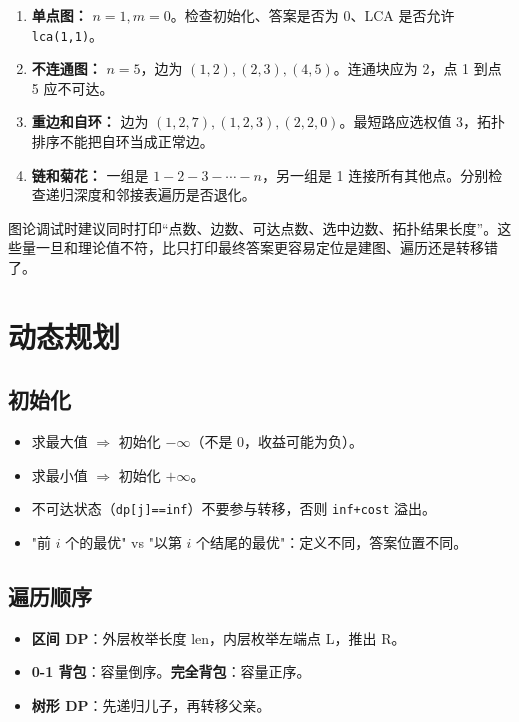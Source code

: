 \documentclass[UTF8,openany,oneside,zihao=-4]{ctexbook}
\begin{document}
\begin{enumerate}
  \item \textbf{单点图：} $n=1,m=0$。检查初始化、答案是否为 0、LCA 是否允许 \lstinline|lca(1,1)|。
  \item \textbf{不连通图：} $n=5$，边为 $(1,2),(2,3),(4,5)$。连通块应为 2，点 1 到点 5 应不可达。
  \item \textbf{重边和自环：} 边为 $(1,2,7),(1,2,3),(2,2,0)$。最短路应选权值 3，拓扑排序不能把自环当成正常边。
  \item \textbf{链和菊花：} 一组是 $1-2-3-\cdots-n$，另一组是 1 连接所有其他点。分别检查递归深度和邻接表遍历是否退化。
\end{enumerate}

\begin{tip}
 图论调试时建议同时打印“点数、边数、可达点数、选中边数、拓扑结果长度”。这些量一旦和理论值不符，比只打印最终答案更容易定位是建图、遍历还是转移错了。
\end{tip}

\chapter{动态规划}

\section{初始化}

\begin{itemize}
  \item 求最大值 $\Rightarrow$ 初始化 $-\infty$（不是 0，收益可能为负）。
  \item 求最小值 $\Rightarrow$ 初始化 $+\infty$。
  \item 不可达状态（\lstinline|dp[j]==inf|）不要参与转移，否则 \lstinline|inf+cost| 溢出。
  \item "前 $i$ 个的最优" vs "以第 $i$ 个结尾的最优"：定义不同，答案位置不同。
\end{itemize}

\section{遍历顺序}

\begin{itemize}
  \item \textbf{区间 DP}：外层枚举长度 len，内层枚举左端点 L，推出 R。
  \item \textbf{0-1 背包}：容量倒序。\textbf{完全背包}：容量正序。
  \item \textbf{树形 DP}：先递归儿子，再转移父亲。
\end{itemize}
\end{document}
